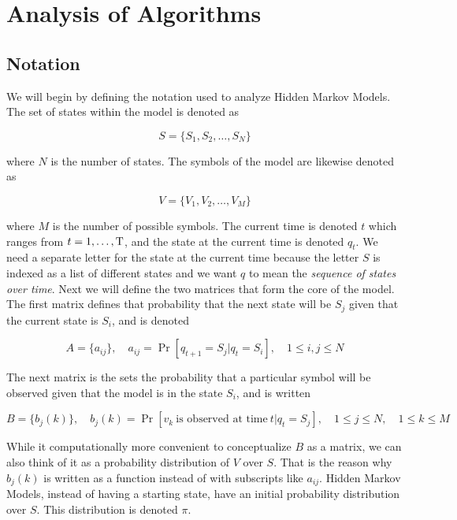 
\section{Analysis of Algorithms}
\subsection{Notation}

We will begin by defining the notation used to analyze Hidden Markov
Models. The set of states within the model is denoted as

\begin{equation}
  S = \{S_1, S_2, \ldots, S_N \}
\end{equation}

where $N$ is the number of states. The symbols of the model are likewise
denoted as

\begin{equation}
  V = \{V_1, V_2, \ldots, V_M \}
\end{equation}

where $M$ is the number of possible symbols. The current time is denoted $t$
which ranges from $t=1, \ldots, \mathrm{T}$, and the state at the current
time is denoted $q_t$. We need a separate letter for the state at the
current time because the letter $S$ is indexed as a list of different
states and we want $q$ to mean the \emph{sequence of states over time}.
Next we will define the two matrices that form the core of the model.
The first matrix defines that probability that the next state will be
$S_j$ given that the current state is $S_i$, and is denoted

\begin{equation}
  A = \{a_{ij}\}, \quad a_{ij} = \Pr[q_{t+1} = S_j \vert q_{t} = S_i],
  \quad 1 \leq i,j \leq N
\end{equation}

The next matrix is the sets the probability that a particular symbol
will be observed given that the model is in the state $S_i$, and is
written

\begin{equation}
  B = \{b_j(k)\}, \quad b_j(k) = \Pr[v_k\ \textrm{is observed at time}\ t
  \vert q_t = S_j], \quad 1 \leq j \leq N, \quad 1 \leq k \leq M
\end{equation}

While it computationally more convenient to conceptualize $B$ as a
matrix, we can also think of it as a probability distribution of $V$
over $S$. That is the reason why $b_j(k)$ is written as a function instead of
with subscripts like $a_{ij}$. Hidden Markov Models, instead of having a
starting state, have an initial probability distribution over $S$. This
distribution is denoted $\pi$.

